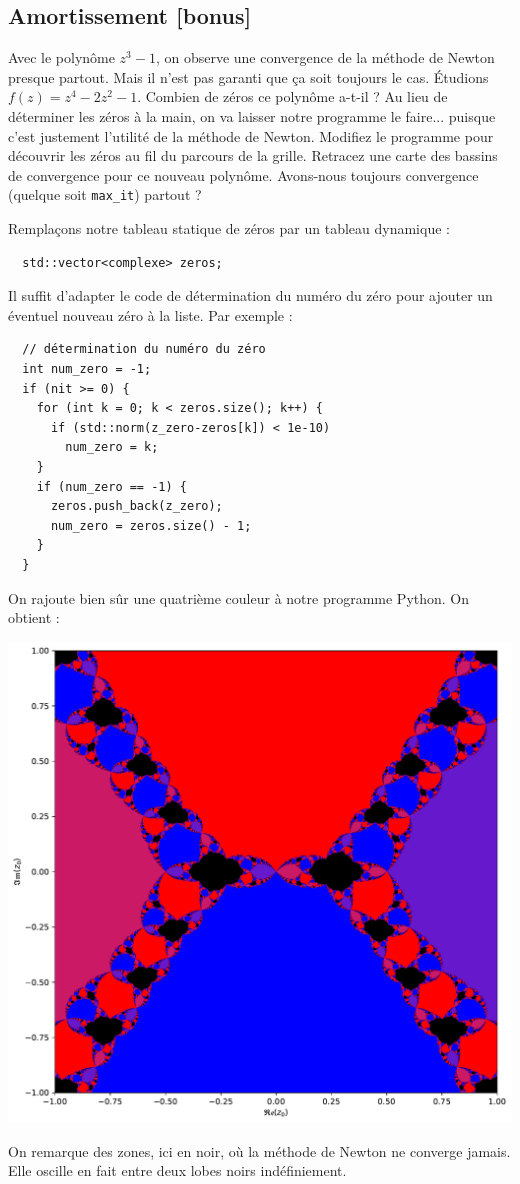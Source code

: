 \documentclass{book}
\newcommand{\inline}[1]{\texttt{#1}}
\begin{document}
\subsection{Amortissement [bonus]}

Avec le polynôme $z^3-1$, on observe une convergence de la méthode de Newton presque partout. Mais il n'est pas garanti que ça soit toujours le cas. Étudions $f(z)=z^4-2z^2-1$. Combien de zéros ce polynôme a-t-il ? Au lieu de déterminer les zéros à la main, on va laisser notre programme le faire... puisque c'est justement l'utilité de la méthode de Newton. Modifiez le programme pour découvrir les zéros au fil du parcours de la grille. Retracez une carte des bassins de convergence pour ce nouveau polynôme. Avons-nous toujours convergence (quelque soit \inline{max_it}) partout ?\\

\begin{correction}
Remplaçons notre tableau statique de zéros par un tableau dynamique :
\begin{verbatim}
  std::vector<complexe> zeros;
\end{verbatim}
Il suffit d'adapter le code de détermination du numéro du zéro pour ajouter un éventuel nouveau zéro à la liste. Par exemple :
\begin{verbatim}
  // détermination du numéro du zéro
  int num_zero = -1;
  if (nit >= 0) {
    for (int k = 0; k < zeros.size(); k++) {
      if (std::norm(z_zero-zeros[k]) < 1e-10)
        num_zero = k;
    }
    if (num_zero == -1) {
      zeros.push_back(z_zero);
      num_zero = zeros.size() - 1;
    }
  }
\end{verbatim}
On rajoute bien sûr une quatrième couleur à notre programme Python. On obtient :
\begin{center}
\includegraphics[width=0.7\linewidth]{TD2/newton_bassins_converg_z4_2z2_1.h1.pdf}
\end{center}
On remarque des zones, ici en noir, où la méthode de Newton ne converge jamais. Elle oscille en fait entre deux lobes noirs indéfiniement.
\end{correction}
\end{document}
